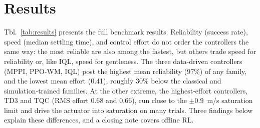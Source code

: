 \section{Results}
\label{sec:results}

Tbl.~\ref{tab:results} presents the full benchmark results.
Reliability (success rate), speed (median settling time), and control effort do not order the controllers the same way: the most reliable are also among the fastest, but others trade speed for reliability or, like IQL, speed for gentleness.
The three data-driven controllers (MPPI, PPO-WM, IQL) post the highest mean reliability (97\%) of any family, and the lowest mean effort (0.41), roughly 30\% below the classical and simulation-trained families.
At the other extreme, the highest-effort controllers, TD3 and TQC (RMS effort 0.68 and 0.66), run close to the $\pm 0.9$~m/s saturation limit and drive the actuator into saturation on many trials.
Three findings below explain these differences, and a closing note covers offline RL.

